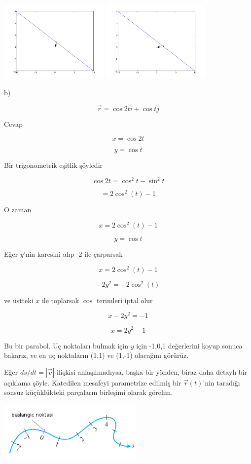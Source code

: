 \documentclass[12pt,fleqn]{article}\usepackage{../../common}
\begin{document}
\includegraphics[height=4cm]{1i3_24.png}
\includegraphics[height=4cm]{1i3_28.png}

b) 

$$ \vec{r} = \cos 2t \hat{i} + \cos t \hat{j}  $$

Cevap

$$ x = \cos 2t $$

$$ y = \cos t $$

Bir trigonometrik eşitlik şöyledir

$$ \cos 2t = \cos^2 t - \sin^2t  $$

$$ = 2 \cos^2(t) - 1 $$

O zaman

$$ x = 2 \cos^2(t) - 1  $$

$$ y = \cos t $$

Eğer $y$'nin karesini alıp -2 ile çarparsak

$$ x = 2\cos^2(t) - 1  $$

$$ -2y^2 = -2\cos^2(t) $$

ve üstteki $x$ ile toplarsak $\cos$ terimleri iptal olur

$$ x-2y^2 = -1 $$

$$ x = 2y^2 -1 $$

Bu bir parabol. Uç noktaları bulmak için $y$ için -1,0,1 değerlerini koyup
sonuca bakarız, ve en uç noktaların (1,1) ve (1,-1) olacağını görürüz. 

Eğer $ds/dt = |\vec{v}|$ ilişkisi anlaşılmadıysa, başka bir yönden, biraz daha
detaylı bir açıklama şöyle. Katedilen mesafeyi parametrize edilmiş bir
$\vec{r}(t)$'nin taradığı sonsuz küçüklükteki parçaların birleşimi olarak
görelim.

\includegraphics[height=3cm]{6_10.png}
\end{document}
